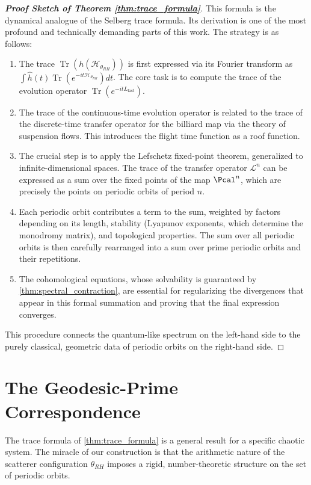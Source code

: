 \documentclass[12pt, letterpaper]{amsart}
\theoremstyle{plain}
\theoremstyle{definition}
\theoremstyle{remark}
\newenvironment{proofsketch}[1]{\begin{proof}[\bf Proof Sketch of #1]}{\end{proof}}
\newcommand{\Lfast}{L_{\text{fast}}}
\newcommand{\LcalOp}{\mathcal{L}}
\DeclareMathOperator{\Tr}{Tr}
\begin{document}
\begin{proofsketch}{Theorem \ref{thm:trace_formula}}
This formula is the dynamical analogue of the Selberg trace formula. Its derivation is one of the most profound and technically demanding parts of this work. The strategy is as follows:
\begin{enumerate}
    \item The trace $\Tr(h(\mathcal{H}_{\theta_{RH}}))$ is first expressed via its Fourier transform as $\int \hat{h}(t) \Tr(e^{-it\mathcal{H}_{\theta_{RH}}}) dt$. The core task is to compute the trace of the evolution operator $\Tr(e^{-it\Lfast})$.
    \item The trace of the continuous-time evolution operator is related to the trace of the discrete-time transfer operator for the billiard map via the theory of suspension flows. This introduces the flight time function as a roof function.
    \item The crucial step is to apply the Lefschetz fixed-point theorem, generalized to infinite-dimensional spaces. The trace of the transfer operator $\LcalOp^n$ can be expressed as a sum over the fixed points of the map $\Pcal^n$, which are precisely the points on periodic orbits of period $n$.
    \item Each periodic orbit contributes a term to the sum, weighted by factors depending on its length, stability (Lyapunov exponents, which determine the monodromy matrix), and topological properties. The sum over all periodic orbits is then carefully rearranged into a sum over prime periodic orbits and their repetitions.
    \item The cohomological equations, whose solvability is guaranteed by \cref{thm:spectral_contraction}, are essential for regularizing the divergences that appear in this formal summation and proving that the final expression converges.
\end{enumerate}
This procedure connects the quantum-like spectrum on the left-hand side to the purely classical, geometric data of periodic orbits on the right-hand side.
\end{proofsketch}

\section{The Geodesic-Prime Correspondence}
\label{sec:geodesic_prime}

The trace formula of \cref{thm:trace_formula} is a general result for a specific chaotic system. The miracle of our construction is that the arithmetic nature of the scatterer configuration $\theta_{RH}$ imposes a rigid, number-theoretic structure on the set of periodic orbits.
\end{document}
